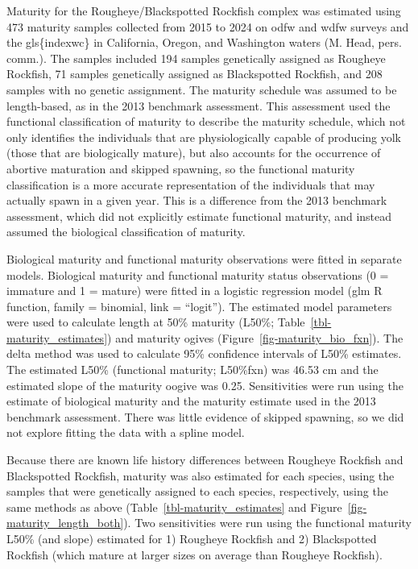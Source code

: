 \documentclass[
]{scrartcl}
\begin{document}
Maturity for the Rougheye/Blackspotted Rockfish complex was estimated
using 473 maturity samples collected from 2015 to 2024 on \gls{odfw} and
\gls{wdfw} surveys and the gls\{indexwc\} in California, Oregon, and
Washington waters (M. Head, pers. comm.). The samples included 194
samples genetically assigned as Rougheye Rockfish, 71 samples
genetically assigned as Blackspotted Rockfish, and 208 samples with no
genetic assignment. The maturity schedule was assumed to be
length-based, as in the 2013 benchmark assessment. This assessment used
the functional classification of maturity to describe the maturity
schedule, which not only identifies the individuals that are
physiologically capable of producing yolk (those that are biologically
mature), but also accounts for the occurrence of abortive maturation and
skipped spawning, so the functional maturity classification is a more
accurate representation of the individuals that may actually spawn in a
given year. This is a difference from the 2013 benchmark assessment,
which did not explicitly estimate functional maturity, and instead
assumed the biological classification of maturity.

Biological maturity and functional maturity observations were fitted in
separate models. Biological maturity and functional maturity status
observations (0 = immature and 1 = mature) were fitted in a logistic
regression model (glm R function, family = binomial, link = ``logit'').
The estimated model parameters were used to calculate length at 50\%
maturity (L50\%; Table~\ref{tbl-maturity_estimates}) and maturity ogives
(Figure~\ref{fig-maturity_bio_fxn}). The delta method was used to
calculate 95\% confidence intervals of L50\% estimates. The estimated
L50\% (functional maturity; L50\%fxn) was 46.53 cm and the estimated
slope of the maturity oogive was 0.25. Sensitivities were run using the
estimate of biological maturity and the maturity estimate used in the
2013 benchmark assessment. There was little evidence of skipped
spawning, so we did not explore fitting the data with a spline model.

Because there are known life history differences between Rougheye
Rockfish and Blackspotted Rockfish, maturity was also estimated for each
species, using the samples that were genetically assigned to each
species, respectively, using the same methods as above
(Table~\ref{tbl-maturity_estimates} and
Figure~\ref{fig-maturity_length_both}). Two sensitivities were run using
the functional maturity L50\% (and slope) estimated for 1) Rougheye
Rockfish and 2) Blackspotted Rockfish (which mature at larger sizes on
average than Rougheye Rockfish).
\end{document}
